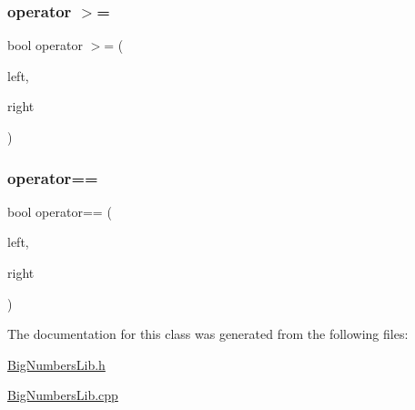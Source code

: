 \mbox{\label{class_big_num_1_1_big_numbers_a078ae5f0c22d51ee735a24cc23aa2d3f}} 
\subsubsection{\texorpdfstring{operator $>$=}{operator >=}}
{\footnotesize\ttfamily bool operator $>$= (\begin{DoxyParamCaption}\item[{const \mbox{\hyperlink{class_big_num_1_1_big_numbers}{Big\+Numbers}} \&}]{left,  }\item[{const \mbox{\hyperlink{class_big_num_1_1_big_numbers}{Big\+Numbers}} \&}]{right }\end{DoxyParamCaption})\hspace{0.3cm}{\ttfamily [friend]}}

\mbox{\label{class_big_num_1_1_big_numbers_adf1a700502274a7dc3c4d1d69f9f8738}} 
\subsubsection{\texorpdfstring{operator==}{operator==}}
{\footnotesize\ttfamily bool operator== (\begin{DoxyParamCaption}\item[{const \mbox{\hyperlink{class_big_num_1_1_big_numbers}{Big\+Numbers}} \&}]{left,  }\item[{const \mbox{\hyperlink{class_big_num_1_1_big_numbers}{Big\+Numbers}} \&}]{right }\end{DoxyParamCaption})\hspace{0.3cm}{\ttfamily [friend]}}



The documentation for this class was generated from the following files\+:\begin{DoxyCompactItemize}
\item 
\mbox{\hyperlink{_big_numbers_lib_8h}{Big\+Numbers\+Lib.\+h}}\item 
\mbox{\hyperlink{_big_numbers_lib_8cpp}{Big\+Numbers\+Lib.\+cpp}}\end{DoxyCompactItemize}
